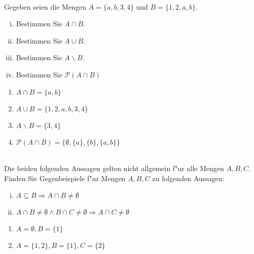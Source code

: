 \newcommand{\printpraesenzlsg}{false}
\newcommand{\printloesungen}{true}
\newcommand{\printbewertungen}{false}
\newcommand{\blattnummer}{1}




\iforiginal{}
\\
Gegeben seien die Mengen $A=\{a,b,3,4\}$ und $B=\{1,2,a,b\}$.
\begin{enumerate}[(i)]
    \item Bestimmen Sie $A\cap B$.
    \item Bestimmen Sie $A\cup B$.
    \item Bestimmen Sie $A\backslash B$.
    \item Bestimmen Sie $\mathscr{P}(A\cap B)$
    
\end{enumerate}

\begin{loesung}
\begin{enumerate}
\item $A\cap B=\{a,b\}$
\item $A\cup B=\{1,2,a,b,3,4\}$
\item $A\backslash B=\{3,4\}$
\item $\mathscr{P}(A\cap B)=\{\emptyset,\{a\},\{b\},\{a,b\}\}$
\end{enumerate}
\end{loesung}

\\
Die beiden folgenden Aussagen gelten nicht allgemein f"ur alle Mengen $A,B,C$. Finden Sie Gegenbeispiele f"ur Mengen $A,B,C$ zu folgenden Aussagen:
\begin{enumerate}[(i)]
\item $A\subseteq B\Rightarrow A\cap B\neq\emptyset$
\item $A\cap B\neq\emptyset\wedge B\cap C\neq\emptyset\Rightarrow A\cap C\neq\emptyset$
\end{enumerate}

\begin{loesung}
\begin{enumerate}
\item $A=\emptyset, B=\{1\}$
\item $A=\{1,2\},B=\{1\}, C=\{2\}$
\end{enumerate}
\end{loesung}

